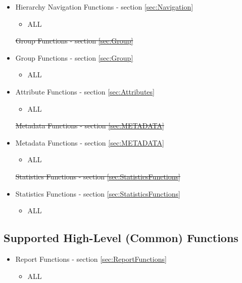 \documentclass[12pt]{report} %
\providecommand{\DIFdeltex}[1]{{\protect\color{red}\sout{#1}}}                      %
\providecommand{\DIFaddbegin}{} %
\providecommand{\DIFaddend}{} %
\providecommand{\DIFdelbegin}{} %
\providecommand{\DIFdelend}{} %
\providecommand{\DIFdel}[1]{\texorpdfstring{\DIFdeltex{#1}}{}} %
\newcommand{\DIFscaledelfig}{0.5}
\newlength{\DIFdelgraphicswidth} %
\newlength{\DIFdelgraphicsheight} %
\newcommand{\DIFaddincludegraphics}[2][]{{\color{blue}\fbox{\DIFOincludegraphics[#1]{#2}}}} %
\newcommand{\DIFdelincludegraphics}[2][]{%
\sbox{\DIFdelgraphicsbox}{\DIFOincludegraphics[#1]{#2}}%
\settoboxwidth{\DIFdelgraphicswidth}{\DIFdelgraphicsbox} %
\settoboxtotalheight{\DIFdelgraphicsheight}{\DIFdelgraphicsbox} %
\scalebox{\DIFscaledelfig}{%
\parbox[b]{\DIFdelgraphicswidth}{\usebox{\DIFdelgraphicsbox}\\[-\baselineskip] \rule{\DIFdelgraphicswidth}{0em}}\llap{\resizebox{\DIFdelgraphicswidth}{\DIFdelgraphicsheight}{%
\setlength{\unitlength}{\DIFdelgraphicswidth}%
\begin{picture}(1,1)%
\thicklines\linethickness{2pt} %
{\color[rgb]{1,0,0}\put(0,0){\framebox(1,1){}}}%
{\color[rgb]{1,0,0}\put(0,0){\line( 1,1){1}}}%
{\color[rgb]{1,0,0}\put(0,1){\line(1,-1){1}}}%
\end{picture}%
}\hspace*{3pt}}} %
} %
\DeclareRobustCommand{\DIFaddbegin}{\DIFOaddbegin \let\includegraphics\DIFaddincludegraphics} %
\DeclareRobustCommand{\DIFaddend}{\DIFOaddend \let\includegraphics\DIFOincludegraphics} %
\DeclareRobustCommand{\DIFdelbegin}{\DIFOdelbegin \let\includegraphics\DIFdelincludegraphics} %
\DeclareRobustCommand{\DIFdelend}{\DIFOaddend \let\includegraphics\DIFOincludegraphics} %
\begin{document}
\begin{itemize}[noitemsep,nolistsep] 
	\item{Hierarchy Navigation Functions - section \ref{sec:Navigation}}
		\begin{itemize}[noitemsep,nolistsep] 
			\item{ALL}
		\end{itemize}
	\DIFdelbegin %
\DIFdel{Group Functions - section \ref{sec:Group}
	}\DIFdelend \DIFaddbegin \item{Group Functions - section \ref{sec:Group}}
		\DIFaddend \begin{itemize}[noitemsep,nolistsep] 
			\item{ALL}
		\end{itemize}
	\item{Attribute Functions - section \ref{sec:Attributes}}
		\begin{itemize}[noitemsep,nolistsep] 
			\item{ALL}
		\end{itemize}
	\DIFdelbegin %
\DIFdel{Metadata Functions - section \ref{sec:METADATA}
	}\DIFdelend \DIFaddbegin \item{Metadata Functions - section \ref{sec:METADATA}}
		\DIFaddend \begin{itemize}[noitemsep,nolistsep] 
			\item{ALL}
		\end{itemize}
	\DIFdelbegin %
\DIFdel{Statistics Functions - section \ref{sec:StatisticsFunctions}
	}\DIFdelend \DIFaddbegin \item{Statistics Functions - section \ref{sec:StatisticsFunctions}}
		\DIFaddend \begin{itemize}[noitemsep,nolistsep] 
			\item{ALL}
		\end{itemize}
\end{itemize}


\subsection{Supported High-Level (Common) Functions}\label{sec:RMMCHighLevel}

\begin{itemize}[noitemsep,nolistsep] 
	\item{Report Functions} - section \ref{sec:ReportFunctions}
	\begin{itemize}[noitemsep,nolistsep] 
		\item{ALL}
	\end{itemize}
\end{itemize}
\end{document}

